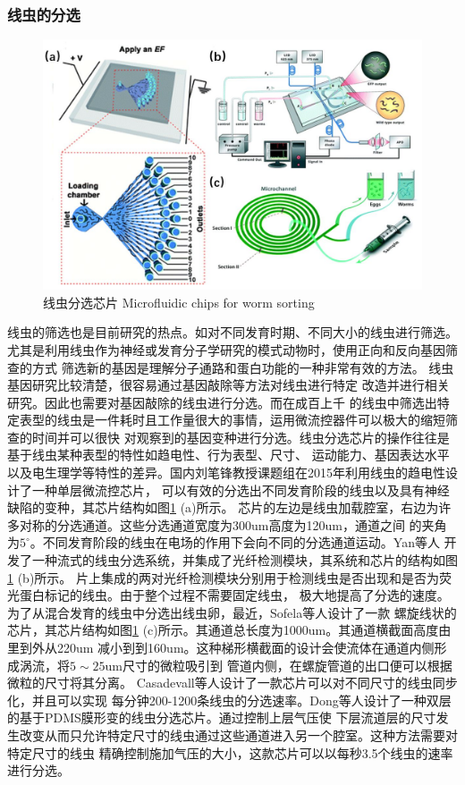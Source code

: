 \subsubsection{线虫的分选}
\label{sec:intro:analog}
	\begin{figure}[t]
	  \centering
	  \includegraphics[width=12cm]{figure/chap1/sorting.jpg}
	  \bicaption
		{线虫分选芯片}
		{Microfluidic chips for worm sorting}
	  \label{fig:sorting}
	\end{figure}
	线虫的筛选也是目前研究的热点。如对不同发育时期、不同大小的线虫进行筛选。
	尤其是利用线虫作为神经或发育分子学研究的模式动物时，使用正向和反向基因筛查的方式
	筛选新的基因是理解分子通路和蛋白功能的一种非常有效的方法。
	线虫基因研究比较清楚，很容易通过基因敲除等方法对线虫进行特定
	改造并进行相关研究。因此也需要对基因敲除的线虫进行分选。而在成百上千
	的线虫中筛选出特定表型的线虫是一件耗时且工作量很大的事情，运用微流控器件可以极大的缩短筛查的时间并可以很快
	对观察到的基因变种进行分选。线虫分选芯片的操作往往是基于线虫某种表型的特性如趋电性、行为表型、尺寸、
	运动能力、基因表达水平以及电生理学等特性的差异。国内刘笔锋教授课题组在2015年利用线虫的趋电性设计了一种单层微流控芯片\cite{C5LC00354G}，
	可以有效的分选出不同发育阶段的线虫以及具有神经缺陷的变种，其芯片结构如图\ref{fig:sorting} (a)所示。
	芯片的左边是线虫加载腔室，右边为许多对称的分选通道。这些分选通道宽度为300um高度为120um，通道之间
	的夹角为$5^\circ$。不同发育阶段的线虫在电场的作用下会向不同的分选通道运动。Yan等人\cite{yan2014continuous}
	开发了一种流式的线虫分选系统，并集成了光纤检测模块，其系统和芯片的结构如图\ref{fig:sorting} (b)所示。
	片上集成的两对光纤检测模块分别用于检测线虫是否出现和是否为荧光蛋白标记的线虫。由于整个过程不需要固定线虫，
	极大地提高了分选的速度。为了从混合发育的线虫中分选出线虫卵，最近，Sofela等人\cite{sofela2018high}设计了一款
	螺旋线状的芯片，其芯片结构如图\ref{fig:sorting} (c)所示。其通道总长度为1000um。其通道横截面高度由里到外从220um
	减小到到160um。这种梯形横截面的设计会使流体在通道内侧形成涡流，将$5\sim25$um尺寸的微粒吸引到
	管道内侧，在螺旋管道的出口便可以根据微粒的尺寸将其分离。
	Casadevall\cite{Casadevall2011High}等人设计了一款芯片可以对不同尺寸的线虫同步化，并且可以实现
	每分钟200-1200条线虫的分选速率。Dong\cite{dong2016versatile}等人设计了一种双层的基于PDMS膜形变的线虫分选芯片。通过控制上层气压使
	下层流道层的尺寸发生改变从而只允许特定尺寸的线虫通过这些通道进入另一个腔室。这种方法需要对特定尺寸的线虫
	精确控制施加气压的大小，这款芯片可以以每秒3.5个线虫的速率进行分选。

